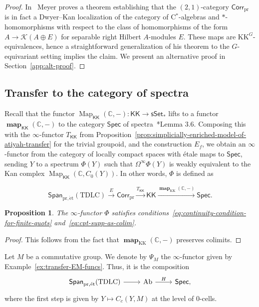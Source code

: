 \documentclass[a4paper,reqno]{amsart}
\theoremstyle{plain}
\newtheorem{proposition}[theorem]{Proposition}
\theoremstyle{definition}
\theoremstyle{remark}
\numberwithin{equation}{section}
\newcommand{\cK}{\mathcal{K}}
\newcommand{\dC}{\mathbb{C}}
\newcommand{\sSet}{\mathsf{sSet}}
\newcommand{\Ab}{\mathrm{Ab}}
\newcommand{\Spec}{\mathsf{Spec}}
\newcommand{\Span}{\mathsf{Span}}
\newcommand{\PrCorr}{\mathsf{Corr}_{\mathrm{pr}}}
\newcommand{\KK}{\mathrm{KK}}
\newcommand{\icKK}{\mathsf{KK}}
\newcommand{\pret}{\mathrm{pr,\acute{e}t}}
\newcommand{\TDLC}{\mathrm{TDLC}}
\DeclareMathOperator{\Map}{Map}
\DeclareMathOperator{\map}{\mathbf{map}}
\begin{document}
\begin{proof}
In~\cite{arXiv:2508.21601} Meyer proves a theorem establishing that the $(2, 1)$-category $\PrCorr$ is in fact a Dwyer--Kan localization of the category of C$^*$-algebras and $\ast$-homomorphisms with respect to the class of homomorphisms of the form $A \to \cK(A \oplus E)$ for separable right Hilbert $A$-modules $E$.
These maps are $\KK^G$-equivalences, hence a straightforward generalization of his theorem to the $G$-equivariant setting implies the claim.
We present an alternative proof in Section~\ref{app:alt-proof}.
\end{proof}

\subsection{Transfer to the category of spectra}

Recall that the functor $\Map_{\icKK}(\dC, -)\colon \icKK \to \sSet_*$ lifts to a functor $\map_{\icKK}(\dC, -)$ to the category $\Spec$ of spectra~\cite{landnik:comp}*{Lemma 3.6}.
Composing this with the $\infty$-functor $T_\icKK$ from Proposition~\ref{prop:simplicially-enriched-model-of-atiyah-transfer} for the trivial groupoid, and the construction $E_f$, we obtain an $\infty$-functor from the category of locally compact spaces with étale maps to $\Spec$, sending $Y$ to a spectrum $\Phi(Y)$ such that $\Omega^\infty \Phi(Y)$ is weakly equivalent to the Kan complex $\Map_{\icKK}(\dC, C_0(Y))$. In other words, $\Phi$ is defined as

\begin{equation*}%
\Span_{\pret}(\TDLC)\overset{E}{\longrightarrow} \PrCorr\xrightarrow{T_\icKK} \icKK \xrightarrow{\map_{\KK}(\dC, -)}\Spec.
\end{equation*}

\begin{proposition}\label{prop:Phi-has-prop-cc}
The $\infty$-functor $\Phi$ satisfies conditions~\eqref{eq:continuity-condition-for-finite-quots} and~\eqref{eq:cpt-supp-as-colim}.
\end{proposition}
\begin{proof}
This follows from the fact that $\map_{\KK}(\dC, -)$ preserves colimits.
\end{proof}

Let $M$ be a commutative group.
We denote by $\Psi_M$ the $\infty$-functor given by Example~\ref{ex:transfer-EM-funcs}. Thus, it is the composition
\[
\begin{tikzcd}
\Span_{\pret}(\TDLC) \arrow[r] & \Ab \arrow[r, "H"] & \Spec,
\end{tikzcd}
\]
where the first step is given by $Y \mapsto C_c(Y, M)$ at the level of $0$-cells.
\end{document}
